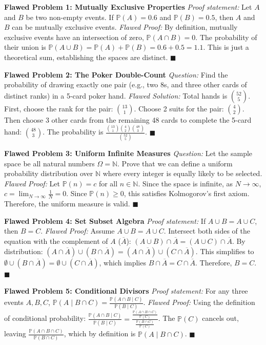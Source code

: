 \documentclass[11pt, letterpaper]{article}
\theoremstyle{definition}
\theoremstyle{remark}
\newcommand{\Prob}{\mathbb{P}}
\newcommand{\comp}[1]{\overline{#1}}
\begin{document}
\textbf{Flawed Problem 1: Mutually Exclusive Properties}
\textit{Proof statement:} Let $A$ and $B$ be two non-empty events. If $\Prob(A) = 0.6$ and $\Prob(B) = 0.5$, then $A$ and $B$ can be mutually exclusive events.
\textit{Flawed Proof:} By definition, mutually exclusive events have an intersection of zero, $\Prob(A \cap B) = 0$. The probability of their union is $\Prob(A \cup B) = \Prob(A) + \Prob(B) = 0.6 + 0.5 = 1.1$. This is just a theoretical sum, establishing the spaces are distinct. $\blacksquare$

\textbf{Flawed Problem 2: The Poker Double-Count}
\textit{Question:} Find the probability of drawing exactly one pair (e.g., two 8s, and three other cards of distinct ranks) in a 5-card poker hand.
\textit{Flawed Solution:} Total hands is $\binom{52}{5}$. First, choose the rank for the pair: $\binom{13}{1}$. Choose 2 suits for the pair: $\binom{4}{2}$. Then choose 3 other cards from the remaining 48 cards to complete the 5-card hand: $\binom{48}{3}$. The probability is $\frac{\binom{13}{1}\binom{4}{2}\binom{48}{3}}{\binom{52}{5}}$. $\blacksquare$

\textbf{Flawed Problem 3: Uniform Infinite Measures}
\textit{Question:} Let the sample space be all natural numbers $\Omega = \mathbb{N}$. Prove that we can define a uniform probability distribution over $\mathbb{N}$ where every integer is equally likely to be selected.
\textit{Flawed Proof:} Let $\Prob(n) = c$ for all $n \in \mathbb{N}$. Since the space is infinite, as $N \to \infty$, $c = \lim_{N \to \infty} \frac{1}{N} = 0$. Since $\Prob(n) \ge 0$, this satisfies Kolmogorov's first axiom. Therefore, the uniform measure is valid. $\blacksquare$

\textbf{Flawed Problem 4: Set Subset Algebra}
\textit{Proof statement:} If $A \cup B = A \cup C$, then $B = C$.
\textit{Flawed Proof:} Assume $A \cup B = A \cup C$. Intersect both sides of the equation with the complement of $A$ ($\comp{A}$):
$(A \cup B) \cap \comp{A} = (A \cup C) \cap \comp{A}$.
By distribution: $(A \cap \comp{A}) \cup (B \cap \comp{A}) = (A \cap \comp{A}) \cup (C \cap \comp{A})$.
This simplifies to $\emptyset \cup (B \cap \comp{A}) = \emptyset \cup (C \cap \comp{A})$, which implies $B \cap \comp{A} = C \cap \comp{A}$. Therefore, $B = C$. $\blacksquare$

\textbf{Flawed Problem 5: Conditional Divisors}
\textit{Proof statement:} For any three events $A, B, C$, $\Prob(A \mid B \cap C) = \frac{\Prob(A \cap B \mid C)}{\Prob(B \mid C)}$.
\textit{Flawed Proof:} 
Using the definition of conditional probability:
$\frac{\Prob(A \cap B \mid C)}{\Prob(B \mid C)} = \frac{\frac{\Prob(A \cap B \cap C)}{\Prob(C)}}{\frac{\Prob(B \cap C)}{\Prob(C)}}$.
The $\Prob(C)$ cancels out, leaving $\frac{\Prob(A \cap B \cap C)}{\Prob(B \cap C)}$, which by definition is $\Prob(A \mid B \cap C)$. $\blacksquare$
\end{document}
